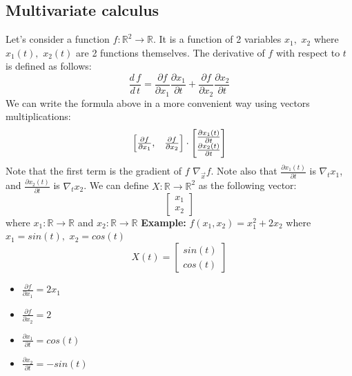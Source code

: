 \subsection{Multivariate calculus}
Let's consider a function $f: \mathbb{R}^{2} \rightarrow \mathbb{R}$. It is a function of 2 variables $x_{1}, \,\, x_{2}$ where $x_{1}(t),\,\, x_{2}(t)$ are 2 functions themselves. The derivative of $f$ with respect to $t$ is defined as follows:
\[\frac{d\,f}{d\,t} = \frac{\partial f}{\partial x_{1}}\frac{\partial x_{1}}{\partial t} + \frac{\partial f}{\partial x_{2}}\frac{\partial x_{2}}{\partial t}\]
We can write the formula above in a more convenient way using vectors multiplications:
\[
    \begin{bmatrix}
        \frac{\partial f}{\partial x_{1}}, & \frac{\partial f}{\partial x_{2}} 
    \end{bmatrix}
    \cdot
    \begin{bmatrix}
        \frac{\partial x_{1}(t)}{\partial t}\\
        \vspace{1pt}
        \frac{\partial x_{2}(t)}{\partial t}\\
    \end{bmatrix}
\]
Note that the first term is the gradient of $f$ $\nabla_{\Vec{x}} f$. Note also that $\frac{\partial x_{1}(t)}{\partial t}$ is $\nabla_{t}x_{1}$, and $\frac{\partial x_{2}(t)}{\partial t}$ is $\nabla_t x_2$. We can define $X: \mathbb{R} \rightarrow \mathbb{R}^{2}$ as the following vector:
\[
    \begin{bmatrix}
        x_1 \\
        x_2
    \end{bmatrix}
\]
where $x_1: \mathbb{R} \rightarrow \mathbb{R}$ and $x_2: \mathbb{R} \rightarrow \mathbb{R}$\newline\newline
\textbf{Example:}\newline
$f(x_1, x_2) = x_1^{2} + 2x_2$ where $x_1 = sin(t), \,\, x_2 = cos(t)$
\[
    X(t) = 
    \begin{bmatrix}
        sin(t) \\
        cos(t)
    \end{bmatrix}
\]
\begin{itemize}
    \item $\frac{\partial f}{\partial x_1} = 2x_1$
    \item $\frac{\partial f}{\partial x_2} = 2$
    \item $\frac{\partial x_1}{\partial t} = cos(t)$
    \item $\frac{\partial x_2}{\partial t} = - sin(t)$
\end{itemize}
